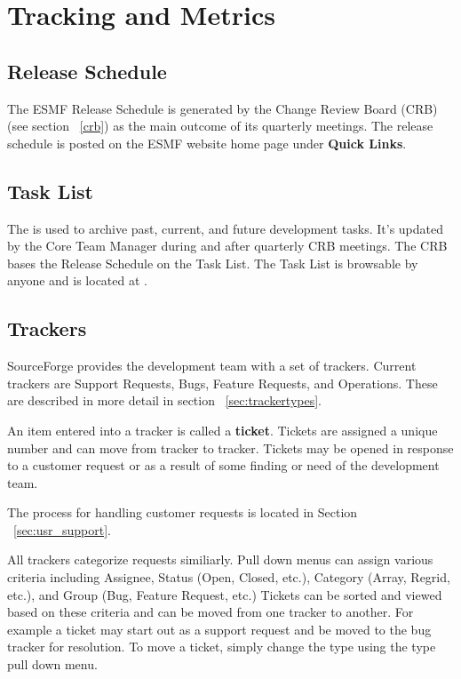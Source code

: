 
\section{Tracking and Metrics}

\subsection{Release Schedule}

The ESMF Release Schedule is generated by the Change Review Board (CRB) (see section ~\ref{crb})
as the main outcome of its quarterly meetings.  The release schedule is posted on the ESMF website home page
under {\bf Quick Links}.

\subsection{Task List}

The  is used
to archive past, current, and future development tasks.  It's updated by the Core Team
Manager during and after quarterly CRB meetings.  The CRB bases the Release Schedule 
on the Task List.  The Task List is browsable by anyone and is located at
.

\subsection{Trackers}
\label{tracking_tools}

SourceForge provides the development team with a set of trackers.  Current trackers are
Support Requests, Bugs, Feature Requests, and Operations.  These are described in more 
detail in section ~\ref{sec:trackertypes}.  

An item entered into a tracker is called a {\bf ticket}. Tickets are assigned a unique
number and can move from tracker to tracker. Tickets may be opened in response to a customer
request or as a result of some finding or need of the development team.

The process for handling customer requests is located in Section ~\ref{sec:usr_support}.

All trackers categorize requests similiarly. Pull down menus can assign various criteria
including Assignee, Status (Open, Closed, etc.), Category (Array, Regrid, etc.), and Group
(Bug, Feature Request, etc.)  Tickets can be sorted and viewed based on these criteria and
can be moved from one tracker to another. For example a ticket may start out as a support
request and be moved to the bug tracker for resolution.  To move a ticket, simply change
the type using the type pull down menu. 

